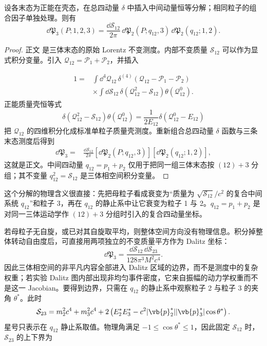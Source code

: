 \begin{proposition}[多体相空间的递归分解]
设各末态为正能在壳态，在总四动量 $\delta$ 中插入中间动量恒等分解；相同粒子的组合因子单独处理。则有
\begin{equation}
 {
 \dd\mathfrak P_3(P;1,2,3)
 =\frac{\dd\mathcal S_{12}}{2\pi}\,
 \dd\mathfrak P_2(P;q_{12},3)\,
 \dd\mathfrak P_2(q_{12};1,2).}
\label{eq:phase3-recursive-dp52}
\end{equation}
\end{proposition}
\begin{proof}
正文 是三体末态的原始 Lorentz 不变测度。内部不变质量 $\mathcal S_{12}$ 可以作为显式积分变量。引入 $\mathcal Q_{12}=\mathcal P_1+\mathcal P_2$，并插入

\begin{align*}
1
={}&\int\dd^4 \mathcal Q_{12}\,
\delta^{(4)}(\mathcal Q_{12}-\mathcal P_1-\mathcal P_2)\\
&\times\int\dd\mathcal S_{12}\,
\delta(\mathcal Q_{12}^2-\mathcal S_{12})\theta(\mathcal Q_{12}^0).
\end{align*}
正能质量壳恒等式
\begin{equation*}
\delta(\mathcal Q_{12}^2-\mathcal S_{12})\theta(\mathcal Q_{12}^0)
=\frac{1}{2E_{12}}\delta(\mathcal Q_{12}^0-E_{12})
\end{equation*}
把 $\mathcal Q_{12}$ 的四维积分化成标准单粒子质量壳测度。重新组合总四动量 $\delta$ 函数与三条末态测度后得到
\begin{align*}
\dd\mathfrak P_3
={}&\frac{\dd\mathcal S_{12}}{2\pi}
\left[\dd\mathfrak P_2(P;q_{12},3)\right]
\left[\dd\mathfrak P_2(q_{12};1,2)\right],
\end{align*}
这就是正文。中间四动量 $q_{12}=p_1+p_2$ 仅用于把同一组三体末态按 $(12)+3$ 分组；其不变量 $q_{12}^2=\mathcal S_{12}$ 是三体相空间积分变量。
\end{proof}

这个分解的物理含义很直接：先把母粒子看成衰变为“质量为 $\sqrt{\mathcal S_{12}}/c^2$ 的复合中间系统 $q_{12}$”和粒子 3，再在 $q_{12}$ 的静止系中让它衰变为粒子 1 与 2。$q_{12}=p_1+p_2$ 是对同一三体运动学作 $(12)+3$ 分组时引入的复合四动量坐标。

若母粒子无自旋，或已对其自旋取平均，则整体空间方向没有物理信息。积分掉整体转动自由度后，可直接用两项独立的不变质量平方作为 Dalitz 坐标：
\begin{equation}
 {
 \dd\mathfrak P_3
 =\frac{\dd\mathcal S_{12}\,\dd\mathcal S_{23}}
 {128\pi^3 M^2c^4}.}
 \label{eq:phase3-dalitz-dp52}
\end{equation}
因此三体相空间的非平凡内容全部进入 Dalitz 区域的边界，而不是测度中的复杂权重；若实验 Dalitz 图内部出现非均匀事件密度，它来自振幅的动力学权重而不是这一 Jacobian。要得到边界，只需在 $q_{12}$ 的静止系中观察粒子 2 与粒子 3 的夹角 $\theta^*$。此时
\begin{equation}
 {
 \mathcal S_{23}
 =m_2^2c^4+m_3^2c^4
 +2\left(E_2^*E_3^*
 -c^2|\vb{p}_2^*||\vb{p}_3^*|\cos\theta^*\right).}
 \label{eq:dalitz-angular-map-dp68}
\end{equation}
星号只表示在 $q_{12}$ 静止系取值。物理角满足 $-1\le\cos\theta^*\le1$，因此固定 $\mathcal S_{12}$ 时，$\mathcal S_{23}$ 的上下界为


